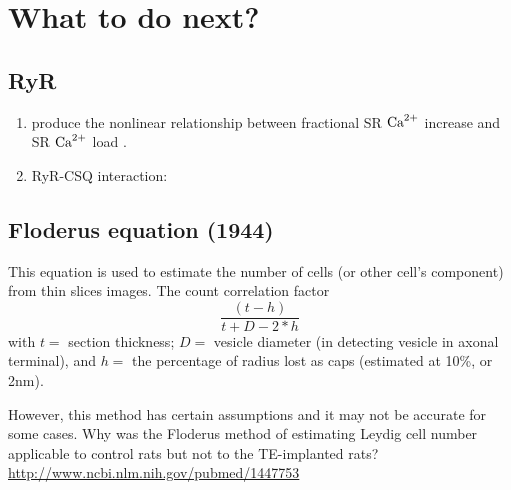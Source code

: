 \chapter{What to do next?}


\section{RyR}

\begin{enumerate}
  \item produce the nonlinear relationship between fractional SR ${\text{Ca}^{2+}}$
  increase and SR ${\text{Ca}^{2+}}$ load \citep{bassani1995fsr, shannon2000pfs}.
  
  \item RyR-CSQ interaction: \citep{Lee2008, tania2010}
\end{enumerate}


\section{Floderus equation (1944)}

This equation is used to estimate the number of cells (or other cell's
component) from thin slices images.
The count correlation factor
\begin{equation}
\frac{(t-h)}{t+D-2*h}
\end{equation}
with $t=$ section thickness; $D=$ vesicle diameter (in detecting
vesicle in axonal terminal), and $h = $ the percentage of radius lost as caps
(estimated at 10\%, or 2nm).

However, this method has certain assumptions and it may not be accurate for some
cases. 
Why was the Floderus method of estimating Leydig cell number applicable to
control rats but not to the TE-implanted rats? 
\url{http://www.ncbi.nlm.nih.gov/pubmed/1447753}
